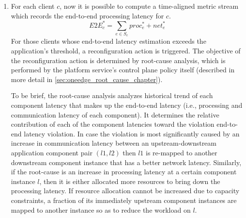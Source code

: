 \begin{enumerate}
\item For each client $c$, now it is possible to compute a time-aligned metric stream which records the end-to-end processing latency for $c$.
\begin{equation}
E2E_c^* = \sum_{e \in S_c} proc_e^* + net_e^*
\end{equation}
For those clients whose end-to-end latency estimation exceeds the application's threshold, a reconfiguration action is triggered. The objective of the reconfiguration action is determined by root-cause analysis, which is performed by the platform service's control plane policy itself (described in more detail in \cref{sec:oneedge_root_cause_chapter}). 
\par To be brief, the root-cause analysis analyzes historical trend of each component latency that makes up the end-to-end latency (i.e., processing and communication latency of each component). It determines the relative contribution of each of the component latencies toward the violation end-to-end latency violation. In case the violation is most significantly caused by an increase in communication latency between an upstream-downstream application component pair $\left( l1, l2 \right)$ then $l1$ is re-mapped to another downstream component instance that has a better network latency. Similarly, if the root-cause is an increase in processing latency at a certain component instance $l$, then it is either allocated more resources to bring down the processing latency. If resource allocation cannot be increased due to capacity constraints, a fraction of its immediately upstream component instances are mapped to another instance so as to reduce the workload on $l$. 
\end{enumerate}

